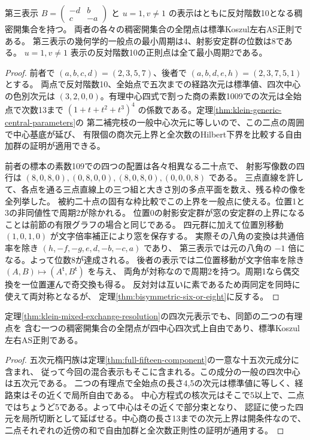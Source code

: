 \begin{corollary}\label{cor:minus-one-second-completion-periods}
第三表示 $B=\left(\begin{smallmatrix}-d&b\\c&-a\end{smallmatrix}\right)$ と
$u=1,v\ne1$ の表示はともに反対階数10となる稠密開集合を持つ。
両者の各々の稠密開集合の全閉点は標準Koszul左右AS正則である。
第三表示の幾何学的一般点の最小周期は4、射影安定群の位数は8である。
$u=1,v\ne1$ 表示の反対階数10の正則点は全て最小周期2である。
\end{corollary}
\begin{proof}
前者で $(a,b,c,d)=(2,3,5,7)$、後者で $(a,b,d,e,h)=(2,3,7,5,1)$ とする。
両点で反対階数10、全始点で五次までの経路次元は標準値、四次中心の色別次元は
$(3,2,0,0)$。有理中心四式で割った商の素数1009での次元は全始点で次数13まで
$(1+t+t^2+t^3)^4$ の係数である。定理\ref{thm:klein-generic-central-parameters}の
第二補完枝の一般中心次元に等しいので、この二点の周囲で中心基底が延び、
有限個の商次元上界と全次数のHilbert下界を比較する自由加群の証明が適用できる。

前者の標本の素数109での四つの配置は各々相異なる二十点で、
射影写像数の四行は $(8,0,8,0),(0,8,0,0),(8,0,8,0),(0,0,0,8)$ である。
三点直線を許して、各点を通る三点直線上の三つ組と大きさ別の多点平面を数え、残る枠の像を全列挙した。
被約二十点の固有な枠比較でこの上界を一般点に使える。位置1と3の非同値性で周期2が除かれる。
位置0の射影安定群が窓の安定群の上界になることは前節の有限グラフの場合と同じである。
四元群に加えて位置別移動 $(1,0,1,0)$ が文字倍率補正により窓を保存する。
実際その八角の変換は共通倍率を除き $(h,-f,-g,e,d,-b,-c,a)$ であり、
第三表示では元の八角の $-1$ 倍になる。よって位数8が達成される。
後者の表示では二位置移動が文字倍率を除き $(A,B)\mapsto(A^{\mathsf t},B^{\mathsf t})$ を与え、
両角が対称なので周期2を持つ。周期1なら偶交換を一位置運んで奇交換も得る。
反対対は互いに素であるため両同定を同時に使えて両対称となるが、
定理\ref{thm:bisymmetric-six-or-eight}に反する。
\end{proof}

\begin{corollary}\label{cor:mixed-ordinary-open-center}
定理\ref{thm:klein-mixed-exchange-resolution}の四次元表示でも、同節の二つの有理点を
含む一つの稠密開集合の全閉点が四中心四次式上自由であり、標準Koszul左右AS正則である。
\end{corollary}
\begin{proof}
五次元楕円族は定理\ref{thm:full-fifteen-component}の一意な十五次元成分に含まれ、
従って今回の混合表示もそこに含まれる。この成分の一般の四次中心は五次元である。
二つの有理点で全始点の長さ4,5の次元は標準値に等しく、経路束はその近くで局所自由である。
中心方程式の核次元はそこで5以上で、二点ではちょうど5である。よって中心はその近くで部分束となり、
認証に使った四元を局所切断として延ばせる。中心商の長さ13までの次元上界は開条件なので、
二点それぞれの近傍の和で自由加群と全次数正則性の証明が通用する。
\end{proof}
